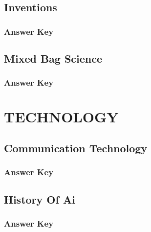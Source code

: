 \documentclass[12pt,a4paper]{book}
\newcounter{totalcounter}
\newcommand{\newsection}[1]{%
  \clearpage
  \section{#1}
}
\begin{document}


\setcounter{totalcounter}{1}

\newsection{Inventions}



\subsection*{Answer Key}



\setcounter{totalcounter}{1}

\newsection{Mixed Bag Science}



\subsection*{Answer Key}



\chapter{TECHNOLOGY}

\setcounter{totalcounter}{1}

\section{Communication Technology}



\subsection*{Answer Key}



\setcounter{totalcounter}{1}

\section{History Of Ai}



\subsection*{Answer Key}
\end{document}
